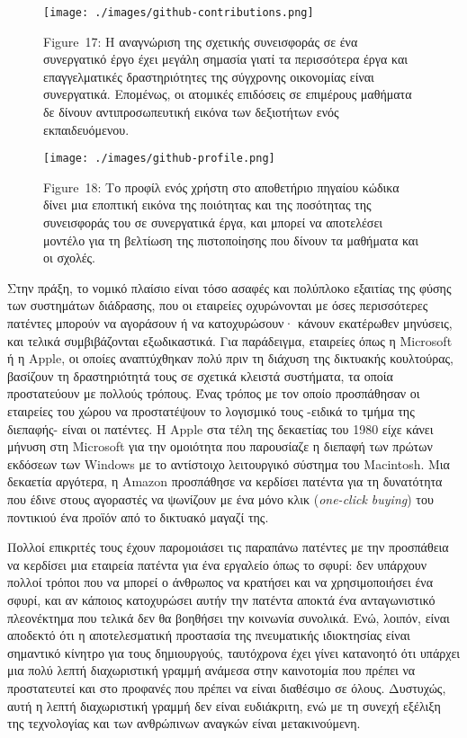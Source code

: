 \documentclass[
]{article}
\begin{document}
\leavevmode{}%
\begin{figure}
\hypertarget{fig:github-contributions}{%
\centering
\texttt{[image: ./images/github-contributions.png]}
\caption{Figure~17: Η αναγνώριση της σχετικής συνεισφοράς σε ένα
συνεργατικό έργο έχει μεγάλη σημασία γιατί τα περισσότερα έργα και
επαγγελματικές δραστηριότητες της σύγχρονης οικονομίας είναι
συνεργατικά. Eπομένως, οι ατομικές επιδόσεις σε επιμέρους μαθήματα δε
δίνουν αντιπροσωπευτική εικόνα των δεξιοτήτων ενός
εκπαιδευόμενου.}\label{fig:github-contributions}
}
\end{figure}

\leavevmode{}%
\begin{figure}
\hypertarget{fig:github-profile}{%
\centering
\texttt{[image: ./images/github-profile.png]}
\caption{Figure~18: Το προφίλ ενός χρήστη στο αποθετήριο πηγαίου κώδικα
δίνει μια εποπτική εικόνα της ποιότητας και της ποσότητας της
συνεισφοράς του σε συνεργατικά έργα, και μπορεί να αποτελέσει μοντέλο
για τη βελτίωση της πιστοποίησης που δίνουν τα μαθήματα και οι
σχολές.}\label{fig:github-profile}
}
\end{figure}

Στην πράξη, το νομικό πλαίσιο είναι τόσο ασαφές και πολύπλοκο εξαιτίας
της φύσης των συστημάτων διάδρασης, που οι εταιρείες οχυρώνονται με όσες
περισσότερες πατέντες μπορούν να αγοράσουν ή να κατοχυρώσουν· κάνουν
εκατέρωθεν μηνύσεις, και τελικά συμβιβάζονται εξωδικαστικά. Για
παράδειγμα, εταιρείες όπως η Microsoft ή η Apple, οι οποίες αναπτύχθηκαν
πολύ πριν τη διάχυση της δικτυακής κουλτούρας, βασίζουν τη δραστηριότητά
τους σε σχετικά κλειστά συστήματα, τα οποία προστατεύουν με πολλούς
τρόπους. Ένας τρόπος με τον οποίο προσπάθησαν οι εταιρείες του χώρου να
προστατέψουν το λογισμικό τους -ειδικά το τμήμα της διεπαφής- είναι οι
πατέντες. Η Apple στα τέλη της δεκαετίας του 1980 είχε κάνει μήνυση στη
Microsoft για την ομοιότητα που παρουσίαζε η διεπαφή των πρώτων εκδόσεων
των Windows με το αντίστοιχο λειτουργικό σύστημα του Macintosh. Μια
δεκαετία αργότερα, η Amazon προσπάθησε να κερδίσει πατέντα για τη
δυνατότητα που έδινε στους αγοραστές να ψωνίζουν με ένα μόνο κλικ
(\emph{one-click buying}) του ποντικιού ένα προϊόν από το δικτυακό
μαγαζί της.

Πολλοί επικριτές τους έχουν παρομοιάσει τις παραπάνω πατέντες με την
προσπάθεια να κερδίσει μια εταιρεία πατέντα για ένα εργαλείο όπως το
σφυρί: δεν υπάρχουν πολλοί τρόποι που να μπορεί ο άνθρωπος να κρατήσει
και να χρησιμοποιήσει ένα σφυρί, και αν κάποιος κατοχυρώσει αυτήν την
πατέντα αποκτά ένα ανταγωνιστικό πλεονέκτημα που τελικά δεν θα βοηθήσει
την κοινωνία συνολικά. Ενώ, λοιπόν, είναι αποδεκτό ότι η αποτελεσματική
προστασία της πνευματικής ιδιοκτησίας είναι σημαντικό κίνητρο για τους
δημιουργούς, ταυτόχρονα έχει γίνει κατανοητό ότι υπάρχει μια πολύ λεπτή
διαχωριστική γραμμή ανάμεσα στην καινοτομία που πρέπει να προστατευτεί
και στο προφανές που πρέπει να είναι διαθέσιμο σε όλους. Δυστυχώς, αυτή
η λεπτή διαχωριστική γραμμή δεν είναι ευδιάκριτη, ενώ με τη συνεχή
εξέλιξη της τεχνολογίας και των ανθρώπινων αναγκών είναι μετακινούμενη.
\end{document}
